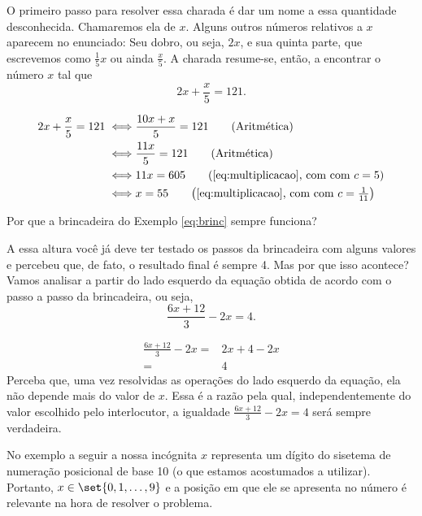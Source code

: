 \begin{solution}
O primeiro passo para resolver essa charada é dar um nome a essa quantidade desconhecida. Chamaremos ela de $x$. Alguns outros números relativos a $x$ aparecem no enunciado: Seu dobro, ou seja, $2x$, e sua quinta parte, que escrevemos como $\frac{1}{5}x$ ou ainda $\frac{x}{5}$. A charada resume-se, então, a encontrar o número $x$ tal que $$2x + \frac{x}{5}  = 121.$$

\begin{align*}
	2x + \frac{x}{5}  = 121 \iff & \frac{10x + x}{5}  = 121 \tag*{(Aritmética)}\\ 
		 \iff & \frac{11x}{5}  = 121 \tag*{(Aritmética)}\\ 
		 \iff & 11x = 605 \tag*{$\left(\text{\ref{eq:multiplicacao}, com com } c = 5 \right) $}\\
		 \iff & x = 55 \tag*{$\left(\text{\ref{eq:multiplicacao}, com com } c = \frac 1 {11} \right) $}
\end{align*}
\end{solution}

\begin{example}
	Por que a brincadeira do Exemplo \ref{eq:brinc} sempre funciona?
\end{example}

\begin{solution}
	A essa altura você já deve ter testado os passos da brincadeira com alguns valores e percebeu que, de fato, o resultado final é sempre 4. Mas por que isso acontece? Vamos analisar a partir do lado esquerdo da equação obtida de acordo com o passo a passo da brincadeira, ou seja, $$\frac{6x+12}{3} - 2x = 4.$$

	\begin{align*}
		\frac{6x+12}{3} - 2x = & 2x + 4 - 2x  \tag*{(Aritmética)}\\ 
			= & 4 \tag*{(Aritmética)}		
	\end{align*}
	Perceba que, uma vez resolvidas as operações do lado esquerdo da equação, ela não depende mais do valor de $x$. Essa é a razão pela qual, independentemente do valor escolhido pelo interlocutor, a igualdade $\frac{6x+12}{3} - 2x = 4$ será sempre verdadeira.
\end{solution}

No exemplo a seguir a nossa incógnita $x$ representa um dígito do sisetema de numeração posicional de base 10 (o que estamos acostumados a utilizar). Portanto, $x \in \set{0,1,\ldots, 9}$ e a posição em que ele se apresenta no número é relevante na hora de resolver o problema. 


